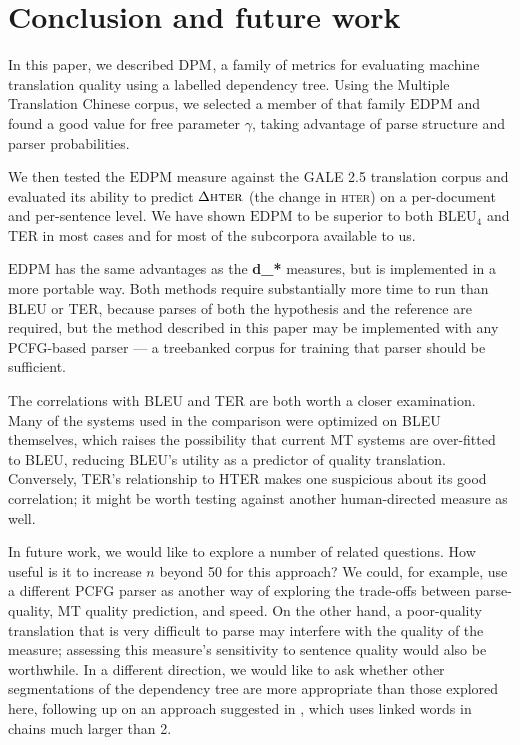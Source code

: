 \documentclass[11pt]{article}
\newcommand{\DPM}[1]{\ensuremath{\mathrm{DPM}_{#1}}}
\newcommand{\myEDPM}[0]{\ensuremath{\mathrm{EDPM}}}
\begin{document}
\section{Conclusion and future work}
\label{sec:conclusion}


In this paper, we described \DPM{}, a family of metrics for evaluating
machine translation quality using a labelled dependency tree.  Using
the Multiple Translation Chinese corpus, we selected a member of that
family \myEDPM{} and found a good value for free parameter $\gamma$,
taking advantage of parse structure and parser probabilities.

We then tested the \myEDPM{} measure against the GALE 2.5 translation
corpus and evaluated its ability to predict $\Delta\textsc{hter}$
(the change in \textsc{hter}) on a per-document and per-sentence
level.  We have shown \myEDPM{} to be superior to both BLEU$_4$
and TER in most cases and for most of the subcorpora available to us.

\myEDPM{} has the same advantages as the
 \textbf{d\_*} measures, but is
implemented in a more portable way.  Both methods require
substantially more time to run than BLEU or TER, because parses of
both the hypothesis and the reference are required, but the method
described in this paper may be implemented with any PCFG-based parser
--- a treebanked corpus for training that parser should be sufficient.

The correlations with BLEU and TER are both worth a closer examination.
%
Many of the systems used
in the comparison were optimized on BLEU themselves, which raises the
possibility that current MT systems are over-fitted to BLEU, reducing
BLEU's utility as a predictor of quality translation. Conversely,
TER's relationship to HTER makes one suspicious about its good
correlation; it might be worth testing against another human-directed
measure as well.

In future work, we would like to explore a number of related
questions.  How useful is it to increase $n$ beyond 50 for this
approach?  We could, for example, use a different PCFG parser as
another way of exploring the trade-offs between parse-quality, MT
quality prediction, and speed.  On the other hand, a poor-quality
translation that is very difficult to parse may interfere with the
quality of the measure; assessing this measure's sensitivity to
sentence quality would also be worthwhile. In a different direction,
we would like to ask whether other segmentations of the dependency
tree are more appropriate than those explored here, following up on an
approach suggested in , which uses
linked words in chains much larger than 2.
\end{document}
